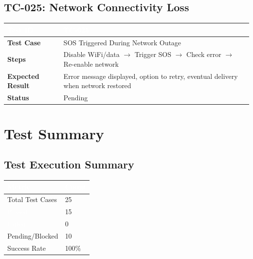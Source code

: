 \documentclass[12pt,a4paper]{article}
\begin{document}
\subsection{TC-025: Network Connectivity Loss}
\begin{table}[h]
\centering
\setlength{\extrarowheight}{10pt}
\begin{tabularx}{\textwidth}{|l|X|}
\hline
\rowcolor{headercolor}
\textcolor{white}{\textbf{Test ID}} & \textcolor{white}{TC-025} \\
\hline
\textbf{Test Case} & SOS Triggered During Network Outage \\
\hline
\textbf{Steps} & Disable WiFi/data $\rightarrow$ Trigger SOS $\rightarrow$ Check error $\rightarrow$ Re-enable network \\
\hline
\textbf{Expected Result} & Error message displayed, option to retry, eventual delivery when network restored \\
\hline
\textbf{Status} & Pending \\
\hline
\end{tabularx}
\end{table}

\newpage

\section{Test Summary}

\subsection{Test Execution Summary}
\begin{table}[h]
\centering
\setlength{\extrarowheight}{12pt}
\begin{tabularx}{\textwidth}{|l|X|}
\hline
\rowcolor{headercolor}
\textcolor{white}{\textbf{Metric}} & \textcolor{white}{\textbf{Count}} \\
\hline
Total Test Cases & 25 \\
\hline
\cellcolor{passcolor}\textcolor{white}{Passed} & 15 \\
\hline
\cellcolor{failcolor}\textcolor{white}{Failed} & 0 \\
\hline
Pending/Blocked & 10 \\
\hline
Success Rate & 100\% \\
\hline
\end{tabularx}
\end{table}
\end{document}
